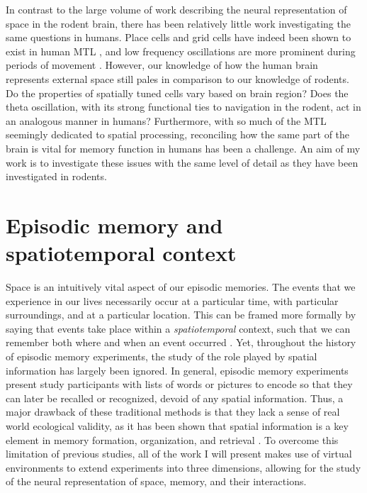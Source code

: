 In contrast to the large volume of work describing the neural representation of space in the rodent brain, there has been relatively little work investigating the same questions in humans. Place cells and grid cells have indeed been shown to exist in human MTL \citep{EkstEtal03,JacoEtal10,JacoEtal13}, and low frequency oscillations are more prominent during periods of movement \citep{CaplEtal03,KahaEtal99}. However, our knowledge of how the human brain represents external space still pales in comparison to our knowledge of rodents. Do the properties of spatially tuned cells vary based on brain region? Does the theta oscillation, with its strong functional ties to navigation in the rodent, act in an analogous manner in humans? Furthermore, with so much of the MTL seemingly dedicated to spatial processing, reconciling how the same part of the brain is vital for memory function in humans has been a challenge. An aim of my work is to investigate these issues with the same level of detail as they have been investigated in rodents.





\section{Episodic memory and spatiotemporal context}

Space is an intuitively vital aspect of our episodic memories. The events that we experience in our lives necessarily occur at a particular time, with particular surroundings, and at a particular location. This can be framed more formally by saying that events take place within a \textit{spatiotemporal} context, such that we can remember both where and when an event occurred \citep{Eich04}. Yet, throughout the history of episodic memory experiments, the study of the role played by spatial information has largely been ignored. In general, episodic memory experiments present study participants with lists of words or pictures to encode so that they can later be recalled or recognized, devoid of any spatial information. Thus, a major drawback of these traditional methods is that they lack a sense of real world ecological validity, as it has been shown that spatial information is a key element in memory formation, organization, and retrieval \citep{MillEtal12a}. To overcome this limitation of previous studies, all of the work I will present makes use of virtual environments to extend experiments into three dimensions, allowing for the study of the neural representation of space, memory, and their interactions.

